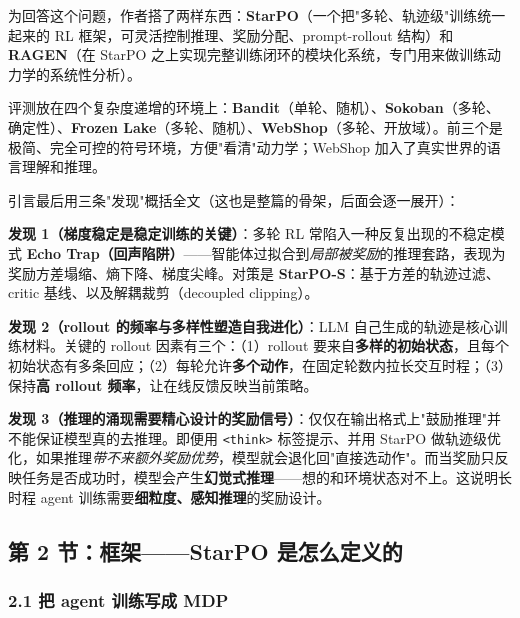 \documentclass[11pt,UTF8,fontset=fandol]{ctexart}
\begin{document}
为回答这个问题，作者搭了两样东西：\textbf{StarPO}（一个把"多轮、轨迹级"训练统一起来的 RL 框架，可灵活控制推理、奖励分配、prompt-rollout 结构）和 \textbf{RAGEN}（在 StarPO 之上实现完整训练闭环的模块化系统，专门用来做训练动力学的系统性分析）。

评测放在四个复杂度递增的环境上：\textbf{Bandit}（单轮、随机）、\textbf{Sokoban}（多轮、确定性）、\textbf{Frozen Lake}（多轮、随机）、\textbf{WebShop}（多轮、开放域）。前三个是极简、完全可控的符号环境，方便"看清"动力学；WebShop 加入了真实世界的语言理解和推理。

引言最后用三条"发现"概括全文（这也是整篇的骨架，后面会逐一展开）：

\begin{findbox}
\textbf{发现 1（梯度稳定是稳定训练的关键）}：多轮 RL 常陷入一种反复出现的不稳定模式 \textbf{Echo Trap（回声陷阱）}——智能体过拟合到\emph{局部被奖励}的推理套路，表现为奖励方差塌缩、熵下降、梯度尖峰。对策是 \textbf{StarPO-S}：基于方差的轨迹过滤、critic 基线、以及解耦裁剪（decoupled clipping）。
\end{findbox}

\begin{findbox}
\textbf{发现 2（rollout 的频率与多样性塑造自我进化）}：LLM 自己生成的轨迹是核心训练材料。关键的 rollout 因素有三个：（1）rollout 要来自\textbf{多样的初始状态}，且每个初始状态有多条回应；（2）每轮允许\textbf{多个动作}，在固定轮数内拉长交互时程；（3）保持\textbf{高 rollout 频率}，让在线反馈反映当前策略。
\end{findbox}

\begin{findbox}
\textbf{发现 3（推理的涌现需要精心设计的奖励信号）}：仅仅在输出格式上"鼓励推理"并不能保证模型真的去推理。即便用 \texttt{<think>} 标签提示、并用 StarPO 做轨迹级优化，如果推理\emph{带不来额外奖励优势}，模型就会退化回"直接选动作"。而当奖励只反映任务是否成功时，模型会产生\textbf{幻觉式推理}——想的和环境状态对不上。这说明长时程 agent 训练需要\textbf{细粒度、感知推理}的奖励设计。
\end{findbox}

\subsection{第 2 节：框架——StarPO 是怎么定义的}

\subsubsection{2.1 把 agent 训练写成 MDP}
\end{document}
